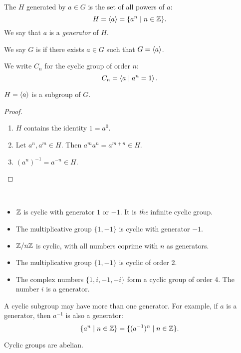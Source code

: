 \begin{definition}
The  $H$ generated by $a\in G$ is the set of all powers of $a$:
\[H=\left\langle a\right\rangle=\{a^n\mid n\in\mathbb Z\}.\]
We say that $a$ is a \emph{generator} of $H$.

We say $G$ is  if there exists $a\in G$ such that $G=\left\langle a\right\rangle$.
\end{definition}

We write $C_n$ for the cyclic group of order $n$:
\[C_n=\left\langle a\mid a^n=1\right\rangle.\]

\begin{lemma*}
$H=\left\langle a\right\rangle$ is a subgroup of $G$.
\end{lemma*}

\begin{proof} \
\begin{enumerate}[label=(\roman*)]
\item $H$ contains the identity $1=a^0$.
\item Let $a^n,a^m\in H$. Then $a^m a^n=a^{m+n}\in H$.
\item $(a^n)^{-1}=a^{-n}\in H$.
\end{enumerate}
\end{proof}

\begin{example} \
\begin{itemize}
\item $\mathbb Z$ is cyclic with generator $1$ or $-1$. It is \emph{the} infinite cyclic group.
\item The multiplicative group $\{1,-1\}$ is cyclic with generator $-1$.
\item $\mathbb Z/n\mathbb Z$ is cyclic, with all numbers coprime with $n$ as generators.
\item The multiplicative group $\{1,-1\}$ is cyclic of order 2.
\item The complex numbers $\{1,i,-1,-i\}$ form a cyclic group of order 4. The number $i$ is a generator.
\end{itemize}
\end{example}

\begin{remark}
A cyclic subgroup may have more than one generator. For example, if $a$ is a generator, then $a^{-1}$ is also a generator:
\[\{a^n\mid n\in\mathbb Z\}=\{(a^{-1})^n\mid n\in\mathbb Z\}.\] 
\end{remark}

\begin{lemma}
Cyclic groups are abelian.
\end{lemma}

